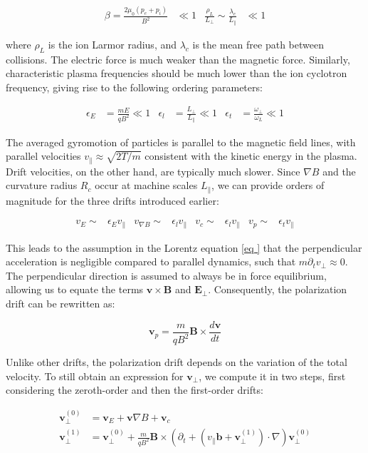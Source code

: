 \begin{align}
	\beta = \frac{2\mu_0(p_e + p_i)}{B^2} &\ll 1 & \frac{\rho_L}{L_\perp} \sim \frac{\lambda_c}{L_\parallel} &\ll 1
\end{align}

where $\rho_L$ is the ion Larmor radius, and $\lambda_c$ is the mean free path between collisions. The electric force is much weaker than the magnetic force. Similarly, characteristic plasma frequencies should be much lower than the ion cyclotron frequency, giving rise to the following ordering parameters:

\begin{align}
	\epsilon_E &= \frac{mE}{qB^2} \ll 1 & \epsilon_l &= \frac{L_\perp}{L_\parallel} \ll 1 & \epsilon_t &= \frac{\omega_\perp}{\omega_L} \ll 1
\end{align}

The averaged gyromotion of particles is parallel to the magnetic field lines, with parallel velocities $v_\parallel \approx \sqrt{2T/m}$ consistent with the kinetic energy in the plasma. Drift velocities, on the other hand, are typically much slower. Since $\nabla B$ and the curvature radius $R_c$ occur at machine scales $L_\parallel$, we can provide orders of magnitude for the three drifts introduced earlier:

\begin{align}
	v_E \sim& \epsilon_E v_\parallel & v_{\nabla B} \sim& \epsilon_l v_\parallel & v_c \sim& \epsilon_l v_\parallel & v_p \sim& \epsilon_t v_\parallel
\end{align}

This leads to the assumption in the Lorentz equation \ref{eq
} that the perpendicular acceleration is negligible compared to parallel dynamics, such that $m\partial_t v_\perp \approx 0$. The perpendicular direction is assumed to always be in force equilibrium, allowing us to equate the terms $\mathbf{v} \times \mathbf{B}$ and $\mathbf{E}_\perp$. Consequently, the polarization drift can be rewritten as:

\begin{equation}
	\mathbf{v}_p = \frac{m}{qB^2}\mathbf{B} \times \frac{d\mathbf{v}}{dt}
\end{equation}

Unlike other drifts, the polarization drift depends on the variation of the total velocity. To still obtain an expression for $\mathbf{v}_\perp$, we compute it in two steps, first considering the zeroth-order and then the first-order drifts:

\begin{align}
	\mathbf{v}_\perp^{(0)} &= \mathbf{v}_E + \mathbf{v}{\nabla B} + \mathbf{v}_c \\
	\mathbf{v}_\perp^{(1)} &= \mathbf{v}_\perp^{(0)} + \frac{m}{qB^2}\mathbf{B} \times \left(\partial_t + \left(v_\parallel\mathbf{b} + \mathbf{v}_\perp^{(1)}\right) \cdot \nabla\right)\mathbf{v}_\perp^{(0)}
\end{align}

